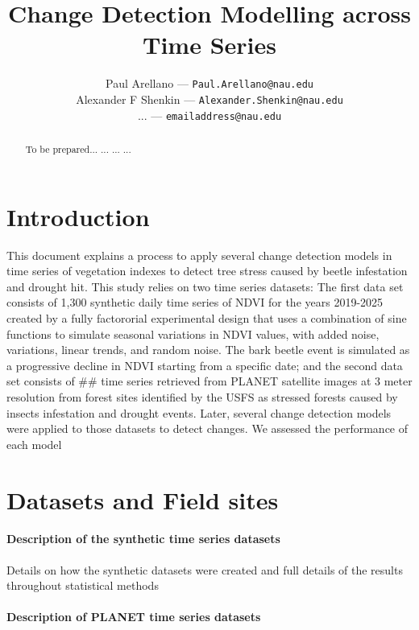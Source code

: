 \documentclass{article}
\title{Change Detection Modelling across Time Series}
\author{%
  Paul Arellano --- \texttt{Paul.Arellano@nau.edu}\\
  Alexander F Shenkin --- \texttt{Alexander.Shenkin@nau.edu}\\
  ... --- \texttt{emailaddress@nau.edu}
}
\begin{document}
\maketitle

\begin{abstract}
To be prepared...
...
...
...

\end{abstract}

\section{Introduction}
\label{sec:intro}
This document explains a process to apply several change detection models in time series of vegetation indexes to detect tree stress caused by beetle infestation and drought hit. This study relies on two time series datasets: The first data set consists of 1,300 synthetic daily time series of NDVI for the years 2019-2025 created by a fully factororial experimental design that uses a combination of sine functions to simulate seasonal variations in NDVI values, with added noise, variations, linear trends, and random noise. The bark beetle event is simulated as a progressive decline in NDVI starting from a specific date; and the second data set consists of ## time series retrieved from PLANET satellite images at 3 meter resolution from forest sites identified by the USFS as stressed forests caused by insects infestation and drought events. Later, several change detection models were applied to those datasets to detect changes. We assessed the performance of each model  








\section{Datasets and Field sites}
\paragraph{Description of the synthetic time series datasets}
Details on how the synthetic datasets were created and full details of the results throughout statistical methods


\paragraph{Description of PLANET time series datasets}
\end{document}
